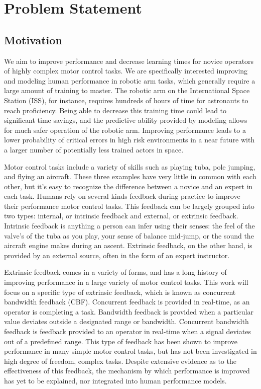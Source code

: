 \documentclass[float=false, crop=false]{standalone}
\begin{document}
\section{Problem Statement}
\subsection{Motivation}
We aim to improve performance and decrease learning times for novice operators of highly complex motor control tasks.
We are specifically interested improving and modeling human performance in robotic arm tasks, which generally require a large amount of training to master.
The robotic arm on the International Space Station (ISS), for instance, requires hundreds of hours of time for astronauts to reach proficiency.
Being able to decrease this training time could lead to significant time savings, and the predictive ability provided by modeling allows for much safer operation of the robotic arm.
Improving performance leads to a lower probability of critical errors in high risk environments in a near future with a larger number of potentially less trained actors in space.

Motor control tasks include a variety of skills such as playing tuba, pole jumping, and flying an aircraft.
These three examples have very little in common with each other, but it’s easy to recognize the difference between a novice and an expert in each task.
Humans rely on several kinds feedback during practice to improve their performance motor control tasks.
This feedback can be largely grouped into two types: internal, or intrinsic feedback and external, or extrinsic feedback.
Intrinsic feedback is anything a person can infer using their senses: the feel of the valve’s of the tuba as you play, your sense of balance mid-jump, or the sound the aircraft engine makes during an ascent.
Extrinsic feedback, on the other hand, is provided by an external source, often in the form of an expert instructor.

Extrinsic feedback comes in a variety of forms, and has a long history of improving performance in a large variety of motor control tasks.
This work will focus on a specific type of extrinsic feedback, which is known as concurrent bandwidth feedback (CBF).
Concurrent feedback is provided in real-time, as an operator is completing a task.
Bandwidth feedback is provided when a particular value deviates outside a designated range or bandwidth.
Concurrent bandwidth feedback is feedback provided to an operator in real-time when a signal deviates out of a predefined range.
This type of feedback has been shown to improve performance in many simple motor control tasks, but has not been investigated in high degree of freedom, complex tasks.
Despite extensive evidence as to the effectiveness of this feedback, the mechanism by which performance is improved has yet to be explained, nor integrated into human performance models.
\end{document}
